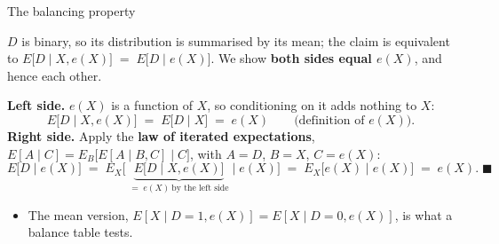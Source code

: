 \documentclass[
  11pt,
  ignorenonframetext,
  aspectratio=169,
]{beamer}
\providecommand{\tightlist}{%
  \setlength{\itemsep}{0pt}\setlength{\parskip}{0pt}}
\newcommand{\indep}{\perp\!\!\!\perp}
\begin{document}
\begin{frame}{The balancing property}
\protect{}\label{the-balancing-property}
\begin{center}
\fbox{\;\textbf{Claim.}\quad $D \indep X \mid e(X)$\;}
\end{center}

\scriptsize

\(D\) is binary, so its distribution is summarised by its mean; the
claim is equivalent to
\(E\big[D \mid X, e(X)\big] \;=\; E\big[D \mid e(X)\big]\). We show
\textbf{both sides equal \(e(X)\)}, and hence each other.

\textbf{Left side.} \(e(X)\) is a function of \(X\), so conditioning on
it adds nothing to \(X\): \[
E\big[D \mid X, e(X)\big] \;=\; E\big[D \mid X\big] \;=\; e(X)
\qquad \text{(definition of } e(X) \text{)} .
\] \textbf{Right side.} Apply the \textbf{law of iterated expectations},
\(E[A \mid C] = E_B\big[E[A \mid B, C] \mid C\big]\), with \(A = D\),
\(B = X\), \(C = e(X)\): \[
E\big[D \mid e(X)\big]
\;=\; E_{X}\Big[\;\underbrace{E\big[D \mid X, e(X)\big]}_{=\;e(X)\ \text{by the left side}} \;\Big|\; e(X)\Big]
\;=\; E_{X}\big[e(X) \mid e(X)\big] \;=\; e(X). \;\blacksquare
\]

\normalsize

\begin{itemize}
\tightlist
\item
  The mean version, \(E[X \mid D{=}1, e(X)] = E[X \mid D{=}0, e(X)]\),
  is what a balance table tests.
\end{itemize}
\end{frame}
\end{document}
